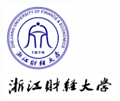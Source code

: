 \newcommand\dunderline[3][-1pt]{{%
  \setbox0=\hbox{#3}
  \ooalign{\copy0\cr\rule[\dimexpr#1-#2\relax]{\wd0}{#2}}}}

\begin{titlepage}
  \makeatletter
  \vspace*{-20mm}
  \centering

  \hspace{9cm}\includegraphics[width=3cm]{InitFile/schoolLogo.png}\\
  \hspace{9cm}\includegraphics[width=5cm, height=1cm]{InitFile/schoolName.png}
  \vspace{10mm}
  
  \ifnum{}  
	\textbf{}
	\vspace{25mm}
  \else  
	\textbf{}  \\  
	\textbf{}  
	\vspace{11mm}
  \fi
  

  \begin{minipage}[c][50mm][t]{\textwidth}
	\begin{center}
	\xiaoer\textmd{\thesisTitle}
	

\end{center}
\end{minipage}
\end{titlepage}
